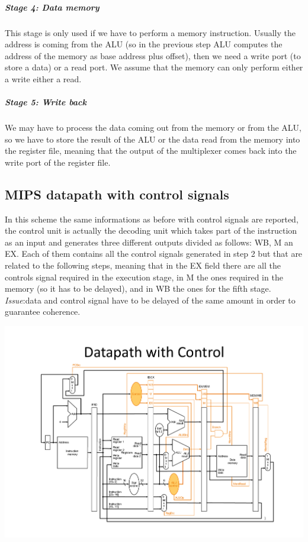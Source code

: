 \subparagraph{Stage 4: Data memory}
This stage is only used if we have to perform a memory instruction. Usually the
address is coming from the ALU (so in the previous step ALU computes the address
of the memory as base address plus offset), then we need a write port (to store
a data) or a read port. We assume that the memory can only perform either a
write either a read.

\subparagraph{Stage 5: Write back}
We may have to process the data coming out from the memory or from the ALU, so
we have to store the result of the ALU or the data read from the memory into the
register file, meaning that the output of the multiplexer comes back into the
write port of the register file.


\subsection{MIPS datapath with control signals}
In this scheme the same informations as before with control signals are
reported, the control unit is actually the decoding unit which takes part of the
instruction as an input and generates three different outputs divided as
follows: WB, M an EX. Each of them contains all the control signals generated in
step 2 but that are related to the following steps, meaning that in the EX field
there are all the controls signal required in the execution stage, in M the ones
required in the memory (so it has to be delayed), and in WB  the ones for the
fifth stage.\\

\textit{Issue}:data and control signal have to be delayed of the same amount in
order to guarantee coherence.

\begin{center}
  \includegraphics[width=1.0\linewidth]{img/img3/mips2}
\end{center}

